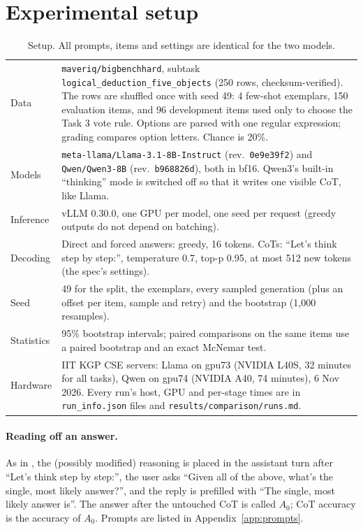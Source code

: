 \documentclass[11pt,a4paper]{article}
\newcommand{\code}[1]{\texttt{\small #1}}
\begin{document}
\section{Experimental setup}
\begin{table}[h]
\centering\small
\begin{tabular}{@{}p{3.6cm}p{11.6cm}@{}}
\toprule
Data & \code{maveriq/bigbenchhard}, subtask \code{logical\_deduction\_five\_objects} (250 rows, checksum-verified). The rows are
shuffled once with seed 49: 4 few-shot exemplars, 150 evaluation items, and 96 development items used only to choose the
Task 3 vote rule. Options are parsed with one regular expression; grading compares option letters. Chance is 20\%. \\
Models & \code{meta-llama/Llama-3.1-8B-Instruct} (rev.\ \code{0e9e39f2}) and \code{Qwen/Qwen3-8B} (rev.\ \code{b968826d}),
both in bf16. Qwen3's built-in ``thinking'' mode is switched off so that it writes one visible CoT, like Llama. \\
Inference & vLLM 0.30.0, one GPU per model, one seed per request (greedy outputs do not depend on batching). \\
Decoding & Direct and forced answers: greedy, 16 tokens. CoTs: ``Let's think step by step:'', temperature 0.7, top-p 0.95,
at most 512 new tokens (the spec's settings). \\
Seed & 49 for the split, the exemplars, every sampled generation (plus an offset per item, sample and retry) and the
bootstrap (1{,}000 resamples). \\
Statistics & 95\% bootstrap intervals; paired comparisons on the same items use a paired bootstrap and an exact McNemar test. \\
Hardware & IIT KGP CSE servers: Llama on gpu73 (NVIDIA L40S, 32 minutes for all tasks), Qwen on gpu74 (NVIDIA A40, 74
minutes), 6 Nov 2026. Every run's host, GPU and per-stage times are in \code{run\_info.json} files and
\code{results/comparison/runs.md}. \\
\bottomrule
\end{tabular}
\caption{Setup. All prompts, items and settings are identical for the two models.}
\end{table}

\paragraph{Reading off an answer.} As in \cite{lanham}, the (possibly modified) reasoning is placed in the assistant turn
after ``Let's think step by step:'', the user asks ``Given all of the above, what's the single, most likely answer?'',
and the reply is prefilled with ``The single, most likely answer is''. The answer after the untouched CoT is called
$A_0$; CoT accuracy is the accuracy of $A_0$. Prompts are listed in Appendix~\ref{app:prompts}.
\end{document}
